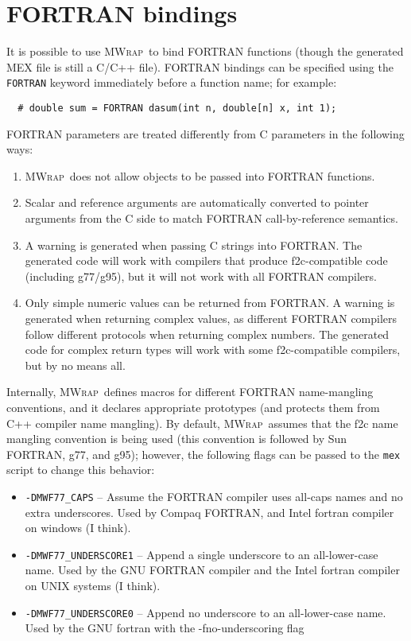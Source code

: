 \documentclass[12pt]{article}
\newcommand{\mwrap}{\textsc{MWrap}}
\begin{document}
\section{FORTRAN bindings}

It is possible to use \mwrap\ to bind FORTRAN functions (though the
generated MEX file is still a C/C++ file).  FORTRAN bindings can be
specified using the {\tt FORTRAN} keyword immediately before a function
name; for example:
\begin{verbatim}
  # double sum = FORTRAN dasum(int n, double[n] x, int 1);
\end{verbatim}

FORTRAN parameters are treated differently from C parameters in the
following ways:
\begin{enumerate}
\item
  \mwrap\ does not allow objects to be passed into FORTRAN functions.
\item
  Scalar and reference arguments are automatically converted to pointer
  arguments from the C side to match FORTRAN call-by-reference semantics.
\item
  A warning is generated when passing C strings into FORTRAN.  The generated
  code will work with compilers that produce f2c-compatible code (including
  g77/g95), but it will not work with all FORTRAN compilers.
\item
  Only simple numeric values can be returned from FORTRAN.  A warning is
  generated when returning complex values, as different FORTRAN compilers
  follow different protocols when returning complex numbers.  The generated
  code for complex return types will work with some f2c-compatible compilers, 
  but by no means all.
\end{enumerate}

Internally, \mwrap\ defines macros for different FORTRAN name-mangling
conventions, and it declares appropriate prototypes (and protects them
from C++ compiler name mangling).  By default, \mwrap\ assumes that
the f2c name mangling convention is being used (this convention is
followed by Sun FORTRAN, g77, and g95); however, the following flags
can be passed to the {\tt mex} script to change this behavior:
\begin{itemize}
\item
  {\tt -DMWF77\_CAPS} -- Assume the FORTRAN compiler uses all-caps
  names and no extra underscores.  Used by Compaq FORTRAN, and Intel fortran compiler on windows (I think).
\item
  {\tt -DMWF77\_UNDERSCORE1} -- Append a single underscore to an
  all-lower-case name.  Used by the GNU FORTRAN compiler and the Intel fortran compiler on UNIX systems (I think).
\item
  {\tt -DMWF77\_UNDERSCORE0} -- Append no underscore to an
  all-lower-case name.  Used by the GNU fortran with the -fno-underscoring flag
\end{itemize}
\end{document}
